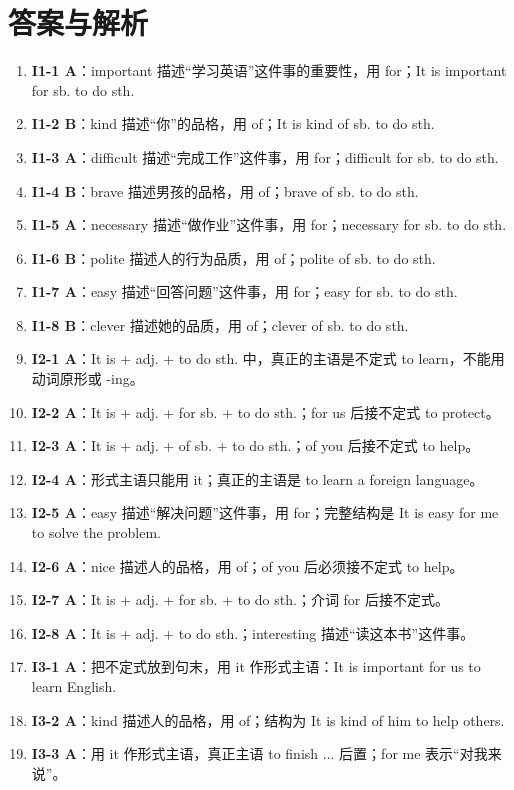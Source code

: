 \documentclass[11pt,a4paper]{ctexart}
\begin{document}
\section*{答案与解析}
\small
\begin{enumerate}[leftmargin=1.6em,itemsep=2pt]
\item \textbf{I1-1 A}：important 描述“学习英语”这件事的重要性，用 for；It is important for sb. to do sth.
\item \textbf{I1-2 B}：kind 描述“你”的品格，用 of；It is kind of sb. to do sth.
\item \textbf{I1-3 A}：difficult 描述“完成工作”这件事，用 for；difficult for sb. to do sth.
\item \textbf{I1-4 B}：brave 描述男孩的品格，用 of；brave of sb. to do sth.
\item \textbf{I1-5 A}：necessary 描述“做作业”这件事，用 for；necessary for sb. to do sth.
\item \textbf{I1-6 B}：polite 描述人的行为品质，用 of；polite of sb. to do sth.
\item \textbf{I1-7 A}：easy 描述“回答问题”这件事，用 for；easy for sb. to do sth.
\item \textbf{I1-8 B}：clever 描述她的品质，用 of；clever of sb. to do sth.
\item \textbf{I2-1 A}：It is + adj. + to do sth. 中，真正的主语是不定式 to learn，不能用动词原形或 -ing。
\item \textbf{I2-2 A}：It is + adj. + for sb. + to do sth.；for us 后接不定式 to protect。
\item \textbf{I2-3 A}：It is + adj. + of sb. + to do sth.；of you 后接不定式 to help。
\item \textbf{I2-4 A}：形式主语只能用 it；真正的主语是 to learn a foreign language。
\item \textbf{I2-5 A}：easy 描述“解决问题”这件事，用 for；完整结构是 It is easy for me to solve the problem.
\item \textbf{I2-6 A}：nice 描述人的品格，用 of；of you 后必须接不定式 to help。
\item \textbf{I2-7 A}：It is + adj. + for sb. + to do sth.；介词 for 后接不定式。
\item \textbf{I2-8 A}：It is + adj. + to do sth.；interesting 描述“读这本书”这件事。
\item \textbf{I3-1 A}：把不定式放到句末，用 it 作形式主语：It is important for us to learn English.
\item \textbf{I3-2 A}：kind 描述人的品格，用 of；结构为 It is kind of him to help others.
\item \textbf{I3-3 A}：用 it 作形式主语，真正主语 to finish ... 后置；for me 表示“对我来说”。

\end{enumerate}
\end{document}
